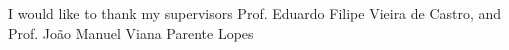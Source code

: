 
\begin{acknowledgments} 

I would like to thank my supervisors Prof. Eduardo Filipe Vieira de Castro, and Prof. João Manuel Viana Parente Lopes

\end{acknowledgments}
\clearpage
\thispagestyle{empty}
\cleardoublepage
